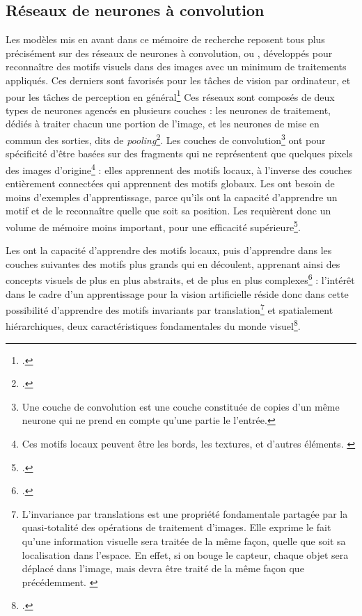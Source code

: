 \subsection{Réseaux de neurones à convolution}
Les modèles mis en avant dans ce mémoire de recherche reposent tous plus précisément sur des réseaux de neurones à convolution, ou \cnn, développés pour reconnaître des motifs visuels dans des images avec un minimum de traitements appliqués. Ces derniers sont favorisés pour les tâches de vision par ordinateur, et pour les tâches de perception en général\footcite{cholletApprentissageProfondAvec2020a} Ces réseaux sont composés de deux types de neurones agencés en plusieurs couches : les neurones de traitement, dédiés à traiter chacun une portion de l'image, et les neurones de mise en commun des sorties, dits de \textit{pooling}\footcite{goodfellowDeepLearning2016}. Les couches de convolution\footnote{Une couche de convolution est une couche constituée de copies d'un même neurone qui ne prend en compte qu'une partie le l'entrée.} ont pour spécificité d'être basées sur des fragments qui ne représentent que quelques pixels des images d'origine\footnote{Ces motifs locaux peuvent être les bords, les textures, et d'autres éléments. \cite{cholletApprentissageProfondAvec2020a}} : elles apprennent des motifs locaux, à l'inverse des couches entièrement connectées qui apprennent des motifs globaux. Les \cnn ont besoin de moins d'exemples d'apprentissage, parce qu'ils ont la capacité d'apprendre un motif et de le reconnaître quelle que soit sa position. Les \cnn requièrent donc un volume de mémoire moins important, pour une efficacité supérieure\footcite{goodfellowDeepLearning2016}. 
    
Les \cnn ont la capacité d'apprendre des motifs locaux, puis d'apprendre dans les couches suivantes des motifs plus grands qui en découlent, apprenant ainsi des concepts visuels de plus en plus abstraits, et de plus en plus complexes\footcite{cholletApprentissageProfondAvec2020a} : l'intérêt dans le cadre d'un apprentissage pour la vision artificielle réside donc dans cette possibilité d'apprendre des motifs invariants par translation\footnote{\og  L'invariance par translations est une propriété fondamentale partagée par la quasi-totalité des opérations de traitement d'images. Elle exprime le fait qu'une information visuelle sera traitée de la même façon, quelle que soit sa localisation dans l'espace. En effet, si on bouge le capteur, chaque objet sera déplacé dans l'image, mais devra être traité de la même façon que précédemment. \fg \cite{ronseInvarianceParTranslations}} et spatialement hiérarchiques, deux caractéristiques fondamentales du monde visuel\footcite{cholletApprentissageProfondAvec2020a}.

